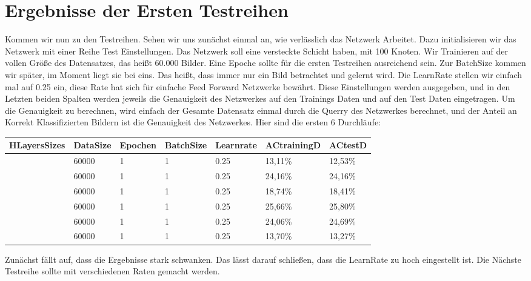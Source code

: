 \documentclass[12pt]{article}
\begin{document}
\section{Ergebnisse der Ersten Testreihen}
Kommen wir nun zu den Testreihen. Sehen wir uns zunächst einmal an, wie verlässlich das Netzwerk Arbeitet. Dazu initialisieren wir das Netzwerk mit einer Reihe Test Einstellungen. Das Netzwerk soll eine versteckte Schicht haben, mit 100 Knoten. Wir Trainieren auf der vollen Größe des Datensatzes, das heißt 60.000 Bilder. Eine Epoche sollte für die ersten Testreihen ausreichend sein. Zur BatchSize kommen wir später, im Moment liegt sie bei eins. Das heißt, dass immer nur ein Bild betrachtet und gelernt wird. Die LearnRate stellen wir einfach mal auf 0.25 ein, diese Rate hat sich für einfache Feed Forward Netzwerke bewährt. Diese Einstellungen werden ausgegeben, und in den Letzten beiden Spalten werden jeweils die Genauigkeit des Netzwerkes auf den Trainings Daten und auf den Test Daten eingetragen. Um die Genauigkeit zu berechnen, wird einfach der Gesamte Datensatz einmal durch die Querry des Netzwerkes berechnet, und der Anteil an Korrekt Klassifizierten Bildern ist die Genauigkeit des Netzwerkes.
Hier sind die ersten 6 Durchläufe:
\begin{table}[H]
    \centering
    \begin{tabular}{|l|l|l|l|l|l|l|}
    \hline
        HLayersSizes & DataSize & Epochen & BatchSize & Learnrate & ACtrainingD & ACtestD \\ \hline
        [780, 100, 10] & 60000 & 1 & 1 & 0.25 & 13,11\% & 12,53\% \\ \hline
        [780, 100, 10] & 60000 & 1 & 1 & 0.25 & 24,16\% & 24,16\% \\ \hline
        [780, 100, 10] & 60000 & 1 & 1 & 0.25 & 18,74\% & 18,41\% \\ \hline
        [780, 100, 10] & 60000 & 1 & 1 & 0.25 & 25,66\% & 25,80\% \\ \hline
        [780, 100, 10] & 60000 & 1 & 1 & 0.25 & 24,06\% & 24,69\% \\ \hline
        [780, 100, 10] & 60000 & 1 & 1 & 0.25 & 13,70\% & 13,27\% \\ \hline
    \end{tabular}
\end{table}
Zunächst fällt auf, dass die Ergebnisse stark schwanken. Das lässt darauf schließen, dass die LearnRate zu hoch eingestellt ist. Die Nächste Testreihe sollte mit verschiedenen Raten gemacht werden.
\end{document}
